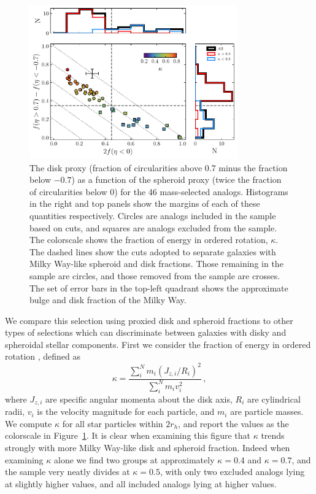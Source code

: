 \begin{figure}
    \centering
    \includegraphics[width=0.8\textwidth]{figure/ch4/spheroid_disk_decomposition.pdf}
    \caption{The disk proxy (fraction of circularities above 0.7 minus the fraction below $-0.7$) as a function of the spheroid proxy (twice the fraction of circularities below 0) for the 46 mass-selected analogs. Histograms in the right and top panels show the margins of each of these quantities respectively. Circles are analogs included in the sample based on cuts, and squares are analogs excluded from the sample. The colorscale shows the fraction of energy in ordered rotation, $\kappa$. The dashed lines show the cuts adopted to separate galaxies with Milky Way-like spheroid and disk fractions. Those remaining in the sample are circles, and those removed from the sample are crosses. The set of error bars in the top-left quadrant shows the approximate bulge and disk fraction of the Milky Way.}
    \label{ch4:fig:bulge-disk-decomposition}
\end{figure}

We compare this selection using proxied disk and spheroid fractions to other types of selections which can discriminate between galaxies with disky and spheroidal stellar components. First we consider the fraction of energy in ordered rotation \parencite{sales10,correa17}, defined as 
\begin{equation}
    \label{ch4:eq:kappa}
    \kappa = \frac{ \sum_{i}^{N} m_{i} (J_{z,i}/R_{i})^{2}  }{ \sum_{i}^{N} m_{i} v_{i}^{2} }\,,
\end{equation}
\noindent where $J_{z,i}$ are specific angular momenta about the disk axis, $R_{i}$ are cylindrical radii, $v_{i}$ is the velocity magnitude for each particle, and $m_{i}$ are particle masses. We compute $\kappa$ for all star particles within $2r_{h}$, and report the values as the colorscale in Figure~\ref{ch4:fig:bulge-disk-decomposition}. It is clear when examining this figure that $\kappa$ trends strongly with more Milky Way-like disk and spheroid fraction. Indeed when examining $\kappa$ alone we find two groups at approximately $\kappa=0.4$ and $\kappa=0.7$, and the sample very neatly divides at $\kappa=0.5$, with only two excluded analogs lying at slightly higher values, and all included analogs lying at higher values.

